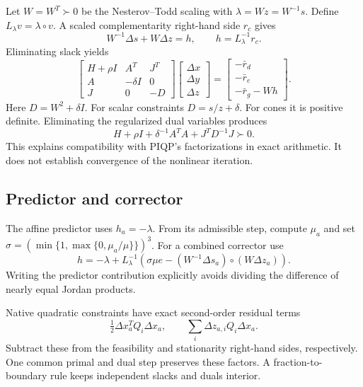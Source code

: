 \documentclass[conference]{IEEEtran}
\begin{document}
Let $W=W^T\succ0$ be the Nesterov--Todd scaling with $\lambda=Wz=W^{-1}s$. Define $L_\lambda v=\lambda\circ v$. A scaled complementarity right-hand side $r_c$ gives
\begin{equation}
 W^{-1}\Delta s+W\Delta z=h,\qquad h=L_\lambda^{-1}r_c.
\end{equation}
Eliminating slack yields
\begin{equation}\label{eq:newton}
 \begin{bmatrix}H+\rho I&A^T&J^T\\A&-\delta I&0\\J&0&-D\end{bmatrix}
 \begin{bmatrix}\Delta x\\\Delta y\\\Delta z\end{bmatrix}
 =\begin{bmatrix}-\bar r_d\\-\bar r_e\\-\bar r_g-Wh\end{bmatrix}.
\end{equation}
Here $D=W^2+\delta I$. For scalar constraints $D=s/z+\delta$. For cones it is positive definite. Eliminating the regularized dual variables produces
\begin{equation}\label{eq:condensed}
 H+\rho I+\delta^{-1}A^TA+J^TD^{-1}J\succ0.
\end{equation}
This explains compatibility with PIQP's factorizations in exact arithmetic. It does not establish convergence of the nonlinear iteration.

\subsection{Predictor and corrector}
The affine predictor uses $h_a=-\lambda$. From its admissible step, compute $\mu_a$ and set $\sigma=(\min\{1,\max\{0,\mu_a/\mu\}\})^3$. For a combined corrector use
\begin{equation}\label{eq:corrector}
 h=-\lambda+L_\lambda^{-1}\left(\sigma\mu e
 -(W^{-1}\Delta s_a)\circ(W\Delta z_a)\right).
\end{equation}
Writing the predictor contribution explicitly avoids dividing the difference of nearly equal Jordan products.

Native quadratic constraints have exact second-order residual terms
\begin{equation}
 \tfrac12\Delta x_a^TQ_i\Delta x_a,\qquad
 \sum_i\Delta z_{a,i}Q_i\Delta x_a.
\end{equation}
Subtract these from the feasibility and stationarity right-hand sides, respectively. One common primal and dual step preserves these factors. A fraction-to-boundary rule keeps independent slacks and duals interior.
\end{document}
